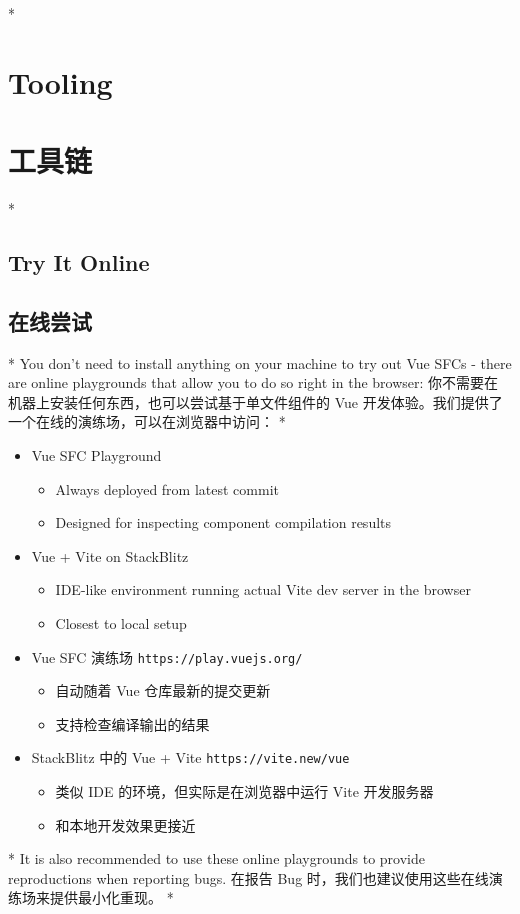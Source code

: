 \begin{paracol}{2}
\switchcolumn[0]*%
\section{Tooling}
\switchcolumn
\section{工具链}
\switchcolumn[0]*%
\subsection{Try It Online}
\switchcolumn
\subsection{在线尝试}
\switchcolumn[0]*%
You don't need to install anything on your machine to try out Vue SFCs -
there are online playgrounds that allow you to do so right in the
browser:
\switchcolumn
你不需要在机器上安装任何东西，也可以尝试基于单文件组件的 Vue
开发体验。我们提供了一个在线的演练场，可以在浏览器中访问：
\switchcolumn[0]*%
\begin{itemize}
\item
  Vue SFC Playground
  \begin{itemize}
  \item
    Always deployed from latest commit
  \item
    Designed for inspecting component compilation results
  \end{itemize}
\item
  Vue + Vite on StackBlitz
  \begin{itemize}
  \item
    IDE-like environment running actual Vite dev server in the browser
  \item
    Closest to local setup
  \end{itemize}
\end{itemize}
\switchcolumn
\begin{itemize}
\item
  Vue SFC 演练场 \verb|https://play.vuejs.org/|
  \begin{itemize}
  \item
    自动随着 Vue 仓库最新的提交更新
  \item
    支持检查编译输出的结果
  \end{itemize}
\item
  StackBlitz 中的 Vue + Vite \verb|https://vite.new/vue|
  \begin{itemize}
  \item
    类似 IDE 的环境，但实际是在浏览器中运行 Vite 开发服务器
  \item
    和本地开发效果更接近
  \end{itemize}
\end{itemize}
\switchcolumn[0]*%
It is also recommended to use these online playgrounds to provide
reproductions when reporting bugs.
\switchcolumn
在报告 Bug 时，我们也建议使用这些在线演练场来提供最小化重现。
\switchcolumn[0]*%

\end{paracol}

